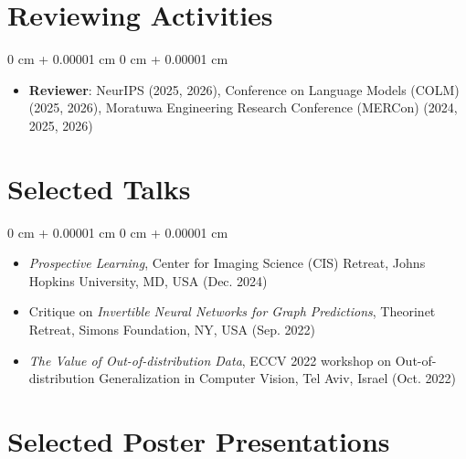\documentclass[10pt, letterpaper]{article}
\newenvironment{highlights}{
    \begin{itemize}[
        topsep=0.10 cm,
        parsep=0.10 cm,
        partopsep=0pt,
        itemsep=0pt,
        leftmargin=0 cm + 10pt
    ]
}{
    \end{itemize}
} %
\newenvironment{onecolentry}{
    \begin{adjustwidth}{
        0 cm + 0.00001 cm
    }{
        0 cm + 0.00001 cm
    }
}{
    \end{adjustwidth}
} %
\begin{document}

    \section{Reviewing Activities}

    \begin{onecolentry}
        \begin{highlights}
            \item \textbf{Reviewer}: NeurIPS (2025, 2026), Conference on Language Models (COLM) (2025, 2026), Moratuwa Engineering Research Conference (MERCon) (2024, 2025, 2026)
        \end{highlights}
    \end{onecolentry}


    \section{Selected Talks}

    \begin{onecolentry}
        \begin{highlights}
            \item \textit{Prospective Learning}, Center for Imaging Science (CIS) Retreat, Johns Hopkins University, MD, USA (Dec. 2024)
            \item Critique on \textit{Invertible Neural Networks for Graph Predictions}, Theorinet Retreat, Simons Foundation, NY, USA (Sep. 2022)
            \item \textit{The Value of Out-of-distribution Data}, ECCV 2022 workshop on Out-of-distribution Generalization in Computer Vision, Tel Aviv, Israel (Oct. 2022)
        \end{highlights}
    \end{onecolentry}


    \section{Selected Poster Presentations}
\end{document}
